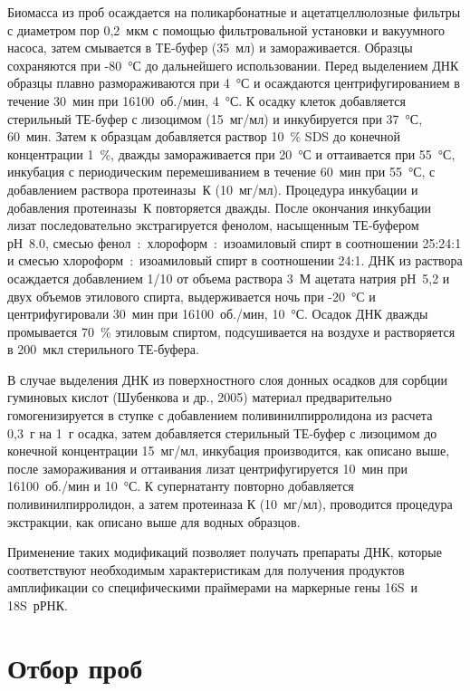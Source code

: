 \documentclass[a4paper,12pt,openany,final]{extreport}
\begin{document}
Биомасса из проб осаждается на поликарбонатные и ацетатцеллюлозные фильтры с диаметром пор 0,2~мкм с помощью фильтровальной установки и вакуумного насоса, затем смывается в ТЕ-буфер (35~мл) и замораживается. Образцы сохраняются при -80~°С до дальнейшего использовании. Перед выделением ДНК образцы плавно размораживаются при 4~°С и осаждаются центрифугированием в течение 30~мин при 16100~об./мин, 4~°С. К осадку клеток добавляется стерильный ТЕ-буфер с лизоцимом (15~мг/мл) и инкубируется при 37~°С, 60~мин. Затем к образцам добавляется раствор 10~\% SDS до конечной концентрации 1~\%, дважды замораживается при 20~°С и оттаивается при 55~°С, инкубация с периодическим перемешиванием в течение 60~мин при 55~°С, с добавлением раствора протеиназы~К (10~мг/мл). Процедура инкубации и добавления протеиназы~К повторяется дважды. После окончания инкубации лизат последовательно экстрагируется фенолом, насыщенным ТЕ-буфером рН~8.0, смесью фенол~:~хлороформ~:~изоамиловый спирт в соотношении 25:24:1 и смесью хлороформ~:~изоамиловый спирт в соотношении 24:1. ДНК из раствора осаждается добавлением 1/10 от объема раствора 3~М ацетата натрия рН~5,2 и двух объемов этилового спирта, выдерживается ночь при -20~°С и центрифугировали 30~мин при 16100~об./мин, 10~°С. Осадок ДНК дважды промывается 70~\% этиловым спиртом, подсушивается на воздухе и растворяется в 200~мкл стерильного ТЕ-буфера.

В случае выделения ДНК из поверхностного слоя донных осадков для сорбции гуминовых кислот (Шубенкова и др., 2005) материал предварительно гомогенизируется в ступке с добавлением поливинилпирролидона из расчета 0,3~г на 1~г осадка, затем добавляется стерильный ТЕ-буфер с лизоцимом до конечной концентрации 15~мг/мл, инкубация производится, как описано выше, после замораживания и оттаивания лизат центрифугируется 10~мин при 16100~об./мин и 10~°С. К супернатанту повторно добавляется поливинилпирролидон, а затем протеиназа К (10~мг/мл), проводится процедура экстракции, как описано выше для водных образцов.

Применение таких модификаций позволяет получать препараты ДНК, которые соответствуют необходимым характеристикам для получения продуктов амплификации со специфическими праймерами на маркерные гены 16S~и 18S~рРНК.

\section{Отбор проб}
\end{document}
